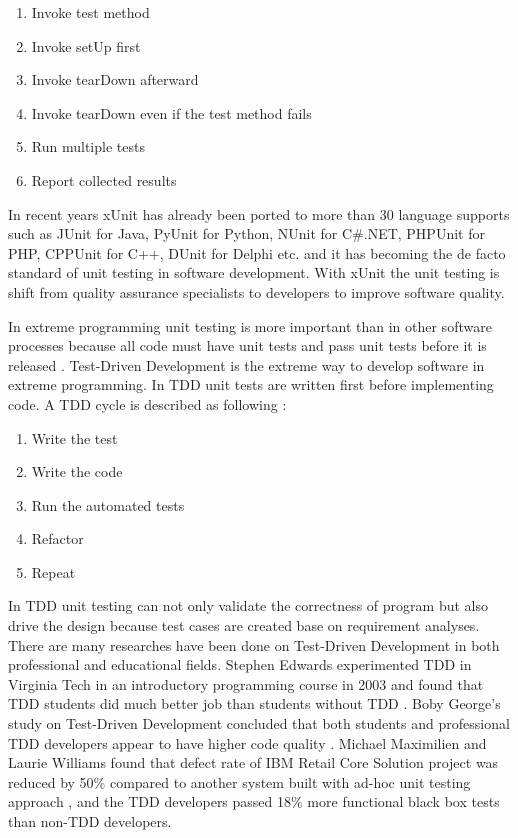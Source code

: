 \documentclass[11pt,twocolumn]{article}
\begin{document}
\begin{enumerate}
\item Invoke test method
\item Invoke setUp first
\item Invoke tearDown afterward
\item Invoke tearDown even if the test method fails
\item Run multiple tests
\item Report collected results
\end{enumerate}

In recent years xUnit has already been ported to more than 30 language
supports such as JUnit for Java, PyUnit for Python, NUnit for C\#.NET,
PHPUnit for PHP, CPPUnit for C++, DUnit for Delphi etc. \cite{XPSoftware}
and it has becoming the de facto standard of unit testing in software
development. With xUnit the unit testing is shift from quality assurance
specialists to developers to improve software quality.

In extreme programming unit testing is more important than in other
software processes because all code must have unit tests and pass unit
tests before it is released \cite{XP96}. Test-Driven Development is the
extreme way to develop software in extreme programming. In TDD unit tests
are written first before implementing code. A TDD cycle is described as
following \cite{TDDWiki}:

\begin{enumerate}
\item Write the test
\item Write the code
\item Run the automated tests
\item Refactor
\item Repeat
\end{enumerate}

In TDD unit testing can not only validate the correctness of program but
also drive the design because test cases are created base on requirement
analyses. There are many researches have been done on Test-Driven
Development in both professional and educational fields. Stephen Edwards
experimented TDD in Virginia Tech in an introductory programming course in
2003 and found that TDD students did much better job than students without
TDD \cite{Edwards:04}. Boby George's study on Test-Driven Development
concluded that both students and professional TDD developers appear to have
higher code quality \cite{George:2003}. Michael Maximilien and Laurie
Williams found that defect rate of IBM Retail Core Solution project was
reduced by 50\% compared to another system built with ad-hoc unit testing
approach \cite{Maximilien:2003}, and the TDD developers passed 18\% more
functional black box tests than non-TDD developers.
\end{document}
